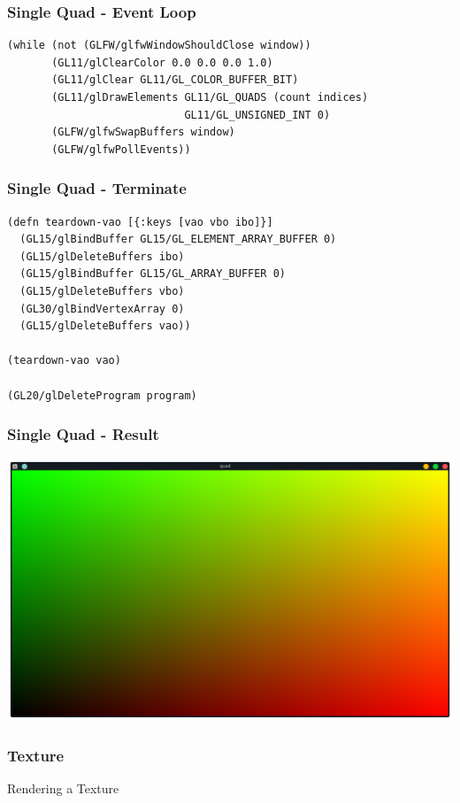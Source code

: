 \documentclass[aspectratio=169,11pt,xcolor=dvipsnames]{beamer}
\begin{document}
\begin{frame}[fragile]
  \frametitle{Single Quad {-} Event Loop}
  \begin{verbatim}
(while (not (GLFW/glfwWindowShouldClose window))
       (GL11/glClearColor 0.0 0.0 0.0 1.0)
       (GL11/glClear GL11/GL_COLOR_BUFFER_BIT)
       (GL11/glDrawElements GL11/GL_QUADS (count indices)
                            GL11/GL_UNSIGNED_INT 0)
       (GLFW/glfwSwapBuffers window)
       (GLFW/glfwPollEvents))
  \end{verbatim}
\end{frame}

\begin{frame}[fragile]
  \frametitle{Single Quad {-} Terminate}
  \begin{verbatim}
(defn teardown-vao [{:keys [vao vbo ibo]}]
  (GL15/glBindBuffer GL15/GL_ELEMENT_ARRAY_BUFFER 0)
  (GL15/glDeleteBuffers ibo)
  (GL15/glBindBuffer GL15/GL_ARRAY_BUFFER 0)
  (GL15/glDeleteBuffers vbo)
  (GL30/glBindVertexArray 0)
  (GL15/glDeleteBuffers vao))

(teardown-vao vao)

(GL20/glDeleteProgram program)
  \end{verbatim}
\end{frame}

\begin{frame}
  \frametitle{Single Quad {-} Result}
  \begin{center}
    \includegraphics[width=.8\textwidth]{quad}
  \end{center}
\end{frame}

\begin{frame}
  \frametitle{Texture}
  \begin{center}
    \begin{huge}
      Rendering a Texture
    \end{huge}
  \end{center}
\end{frame}
\end{document}
